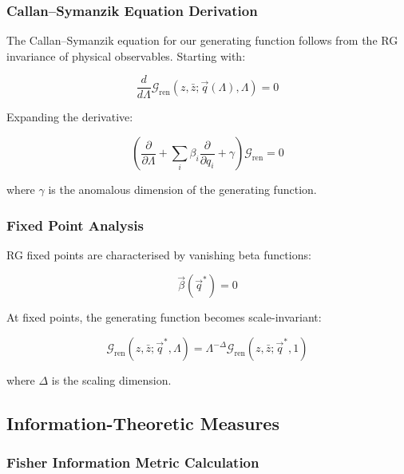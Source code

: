 \subsubsection{Callan–Symanzik Equation Derivation}

The Callan–Symanzik equation for our generating function follows from the RG invariance of physical observables. Starting with:

\begin{equation}
\frac{d}{d\Lambda} \mathcal{G}_{\text{ren}}(z,\bar{z};\vec{q}(\Lambda),\Lambda) = 0
\label{eq:rg-invariance}
\end{equation}

Expanding the derivative:

\begin{equation}
\left( \frac{\partial}{\partial \Lambda} + \sum_i \beta_i \frac{\partial}{\partial q_i} + \gamma \right) \mathcal{G}_{\text{ren}} = 0
\label{eq:callan-symanzik-derivation}
\end{equation}

where $\gamma$ is the anomalous dimension of the generating function.

\subsubsection{Fixed Point Analysis}

RG fixed points are characterised by vanishing beta functions:

\begin{equation}
\vec{\beta}(\vec{q}^*) = 0
\label{eq:fixed-point-condition}
\end{equation}

At fixed points, the generating function becomes scale-invariant:

\begin{equation}
\mathcal{G}_{\text{ren}}(z,\bar{z};\vec{q}^*,\Lambda) = \Lambda^{-\Delta} \mathcal{G}_{\text{ren}}(z,\bar{z};\vec{q}^*,1)
\label{eq:scale-invariance}
\end{equation}

where $\Delta$ is the scaling dimension.

\subsection{Information-Theoretic Measures}

\subsubsection{Fisher Information Metric Calculation}

